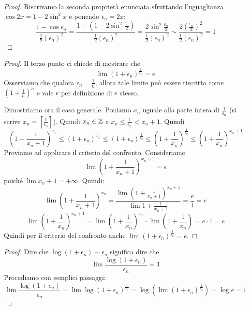 \begin{proof}
Riscrivamo la seconda proprietà enunciata sfruttando l'uguaglianza $\cos 2x = 1 - 2\sin^2x$ e ponendo $\epsilon_n = 2x$:
\begin{equation*}
\frac{1-\cos \epsilon_n}{\frac{1}{2}(\epsilon_n)^2} = \frac{1 - (1-2\sin^2 \frac{\epsilon_n}{2})}{\frac{1}{2}(\epsilon_n)^2} = \frac{2\sin^2 \frac{\epsilon_n}{2}}{\frac{1}{2}(\epsilon_n)^2} \sim \frac{2(\frac{\epsilon_n}{2})^2}{\frac{1}{2}(\epsilon_n)^2} = 1
\end{equation*}
\end{proof}

\begin{proof}
Il terzo punto ci chiede di mostrare che 
\begin{equation*}
\lim (1+\epsilon_n)^\frac{1}{\epsilon_n} = e
\end{equation*}
Osserviamo che qualora $\epsilon_n = \frac{1}{n}$, allora tale limite può essere riscritto come $(1+\frac{1}{n})^n$ e vale $e$ per definizione di $e$ stesso.

Dimostriamo ora il caso generale. Poniamo $x_n$ uguale alla parte intera di $\frac{1}{\epsilon_n}$ (si scrive $x_n = [\frac{1}{\epsilon_n}]$). Quindi $x_n \in \mathbb Z$ e $x_n \le \frac{1}{\epsilon_n} < x_n + 1$. Quindi
\begin{equation*}
\left(1+\frac{1}{x_n+1}\right)^{x_n} \le (1+\epsilon_n)^{x_n} \le (1+\epsilon_n)^\frac{1}{\epsilon_n} \le \left(1+\frac{1}{x_n} \right)^\frac{1}{\epsilon_n} \le \left(1+\frac{1}{x_n} \right)^{x_n+1}
\end{equation*}
Proviamo ad applicare il criterio del confronto. Consideriamo
\begin{equation*}
\lim \left(1+\frac{1}{x_n+1}\right)^{x_n+1} = e
\end{equation*}
poiché $\lim x_n+1 = +\infty$. Quindi:
\begin{equation*}
\lim \left(1+\frac{1}{x_n+1}\right)^{x_n} = \frac{\lim \left(1+\frac{1}{x_n+1}\right)^{x_n+1}}{\lim 1+\frac{1}{x_n+1}} = \frac{e}{1} = e
\end{equation*}
\begin{equation*}
\lim \left(1+\frac{1}{x_n}\right)^{x_n+1} = \lim \left(1+\frac{1}{x_n}\right)^{x_n} \cdot \lim \left(1+\frac{1}{x_n}\right) = e \cdot 1 = e
\end{equation*}
Quindi per il criterio del confronto anche $\lim(1+\epsilon_n)^\frac{1}{\epsilon_n} = e$.
\end{proof}

\begin{proof}
Dire che $\log(1+\epsilon_n) \sim \epsilon_n$ significa dire che
\begin{equation*}
\lim \frac{\log(1+\epsilon_n)}{\epsilon_n} = 1
\end{equation*}
Procediamo con semplici passaggi:
\begin{equation*}
\lim \frac{\log(1+\epsilon_n)}{\epsilon_n} = \lim \log(1+\epsilon_n)^\frac{1}{\epsilon_n} = \log(\lim (1+\epsilon_n)^\frac{1}{\epsilon_n}) = \log e = 1
\end{equation*}
\end{proof}

